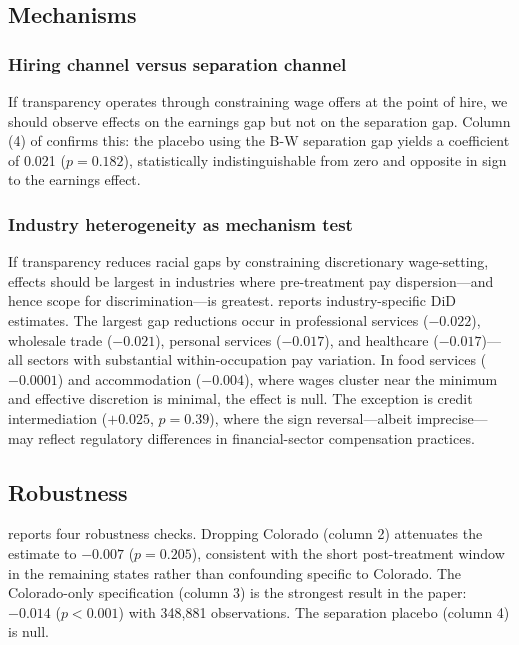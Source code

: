 \documentclass[12pt]{article}
\begin{document}
\subsection{Mechanisms}

\subsubsection*{Hiring channel versus separation channel} If transparency operates through constraining wage offers at the point of hire, we should observe effects on the earnings gap but not on the separation gap. Column (4) of  confirms this: the placebo using the B-W separation gap yields a coefficient of 0.021 ($p = 0.182$), statistically indistinguishable from zero and opposite in sign to the earnings effect.

\subsubsection*{Industry heterogeneity as mechanism test} If transparency reduces racial gaps by constraining discretionary wage-setting, effects should be largest in industries where pre-treatment pay dispersion---and hence scope for discrimination---is greatest.  reports industry-specific DiD estimates. The largest gap reductions occur in professional services ($-0.022$), wholesale trade ($-0.021$), personal services ($-0.017$), and healthcare ($-0.017$)---all sectors with substantial within-occupation pay variation. In food services ($-0.0001$) and accommodation ($-0.004$), where wages cluster near the minimum and effective discretion is minimal, the effect is null. The exception is credit intermediation ($+0.025$, $p = 0.39$), where the sign reversal---albeit imprecise---may reflect regulatory differences in financial-sector compensation practices.



\subsection{Robustness}



 reports four robustness checks. Dropping Colorado (column 2) attenuates the estimate to $-0.007$ ($p = 0.205$), consistent with the short post-treatment window in the remaining states rather than confounding specific to Colorado. The Colorado-only specification (column 3) is the strongest result in the paper: $-0.014$ ($p < 0.001$) with 348,881 observations. The separation placebo (column 4) is null.
\end{document}
